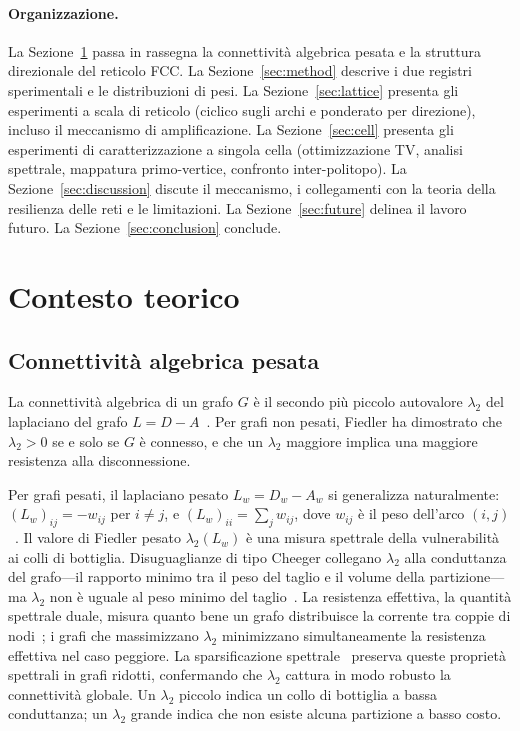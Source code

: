 \documentclass[11pt]{article}
\begin{document}
\paragraph{Organizzazione.}
La Sezione~\ref{sec:background} passa in rassegna la connettivit\`a
algebrica pesata e la struttura direzionale del reticolo FCC. La
Sezione~\ref{sec:method} descrive i due registri sperimentali e le
distribuzioni di pesi. La Sezione~\ref{sec:lattice} presenta gli
esperimenti a scala di reticolo (ciclico sugli archi e ponderato per
direzione), incluso il meccanismo di amplificazione. La
Sezione~\ref{sec:cell} presenta gli esperimenti di caratterizzazione
a singola cella (ottimizzazione TV, analisi spettrale, mappatura
primo-vertice, confronto inter-politopo). La
Sezione~\ref{sec:discussion} discute il meccanismo, i collegamenti
con la teoria della resilienza delle reti e le limitazioni. La
Sezione~\ref{sec:future} delinea il lavoro futuro. La
Sezione~\ref{sec:conclusion} conclude.

\section{Contesto teorico}
\label{sec:background}

\subsection{Connettivit\`a algebrica pesata}

La connettivit\`a algebrica di un grafo $G$ \`e il secondo pi\`u
piccolo autovalore $\lambda_2$ del laplaciano del grafo
$L = D - A$~\cite{fiedler1973}. Per grafi non pesati, Fiedler ha
dimostrato che $\lambda_2 > 0$ se e solo se $G$ \`e connesso, e che
un $\lambda_2$ maggiore implica una maggiore resistenza alla
disconnessione.

Per grafi pesati, il laplaciano pesato
$L_w = D_w - A_w$ si generalizza naturalmente: $(L_w)_{ij} = -w_{ij}$
per $i \neq j$, e $(L_w)_{ii} = \sum_j w_{ij}$, dove $w_{ij}$ \`e il
peso dell'arco $(i,j)$~\cite{mohar1991, chung1997}. Il valore di
Fiedler pesato $\lambda_2(L_w)$ \`e una misura spettrale della
vulnerabilit\`a ai colli di bottiglia. Disuguaglianze di tipo Cheeger
collegano $\lambda_2$ alla conduttanza del grafo---il rapporto minimo
tra il peso del taglio e il volume della partizione---ma $\lambda_2$
non \`e uguale al peso minimo del taglio~\cite{mohar1991, chung1997}.
La resistenza effettiva, la quantit\`a spettrale duale, misura quanto
bene un grafo distribuisce la corrente tra coppie di
nodi~\cite{ghosh2008resistance}; i grafi che massimizzano $\lambda_2$
minimizzano simultaneamente la resistenza effettiva nel caso peggiore.
La sparsificazione spettrale~\cite{spielman2004} preserva queste
propriet\`a spettrali in grafi ridotti, confermando che $\lambda_2$
cattura in modo robusto la connettivit\`a globale. Un $\lambda_2$
piccolo indica un collo di bottiglia a bassa conduttanza; un
$\lambda_2$ grande indica che non esiste alcuna partizione a basso
costo.
\end{document}
